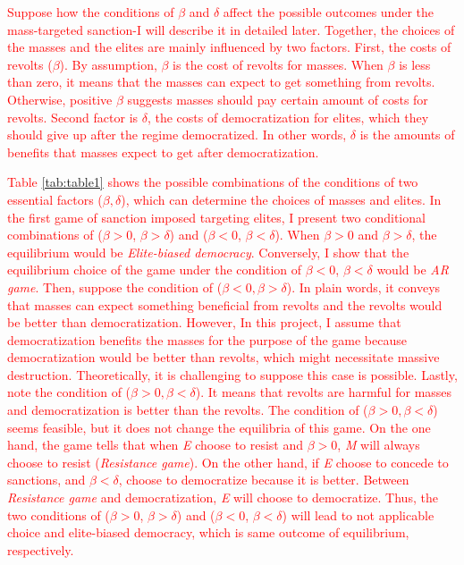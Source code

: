 \documentclass[11pt, letterpage]{article}
\begin{document}
\textcolor{red}{Suppose how the conditions of $\beta$ and $\delta$ affect the possible outcomes under the mass-targeted sanction-I will describe it in detailed later.	Together, the choices of the masses and the elites are mainly influenced by two factors. First, the costs of revolts ($\beta$). By assumption, $\beta$ is the cost of revolts for masses. When $\beta$ is less than zero, it means that the masses can expect to get something from revolts. Otherwise, positive $\beta$ suggests masses should pay certain amount of costs for revolts. Second factor is $\delta$, the costs of democratization for elites, which they should give up after the regime democratized. In other words, $\delta$ is the amounts of benefits that masses expect to get after democratization.}

\textcolor{red}{Table \ref{tab:table1} shows the possible combinations of the conditions of two essential factors ($\beta, \delta$), which can determine the choices of masses and elites. In the first game of sanction imposed targeting elites, I present two conditional combinations of ($\beta > 0$, $\beta > \delta$) and ($\beta < 0$, $\beta < \delta$). When $\beta > 0$ and $\beta > \delta$, the equilibrium would be \textit{Elite-biased democracy}. Conversely, I show that the equilibrium choice of the game under the condition of $\beta < 0$, $\beta < \delta$ would be \textit{AR game}. Then, suppose the condition of ($\beta < 0, \beta > \delta$). In plain words, it conveys that masses can expect something beneficial from revolts and the revolts would be better than democratization. However, In this project, I assume that democratization benefits the masses for the purpose of the game because democratization would be better than revolts, which might necessitate massive destruction. Theoretically, it is challenging to suppose this case is possible. Lastly, note the condition of ($\beta > 0, \beta < \delta$). It means that revolts are harmful for masses and democratization is better than the revolts. The condition of ($\beta > 0, \beta < \delta$) seems feasible, but it does not change the equilibria of this game. On the one hand, the game tells that when \textit{E} choose to resist and $\beta>0$,  \textit{M} will always choose to resist (\textit{Resistance game}). On the other hand, if \textit{E} choose to concede to sanctions, and $\beta < \delta$,  choose to democratize because it is better. Between \textit{Resistance game} and democratization, \textit{E} will choose to democratize. Thus, the two conditions of ($\beta > 0$, $\beta > \delta$) and ($\beta < 0$, $\beta < \delta$) will lead to not applicable choice and elite-biased democracy, which is same outcome of equilibrium, respectively.}
\end{document}
